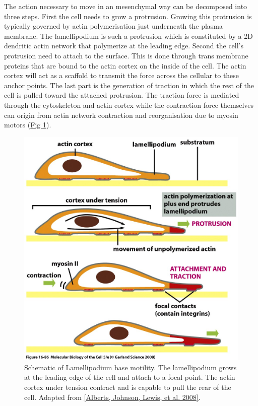 \documentclass[A4paperpaper,11pt,english]{sphinxmanual}
\begin{document}
The action necessary to move in an mesenchymal way can be decomposed into three
steps. First the cell needs to grow a protrusion. Growing this protrusion is
typically governed by actin polymerisation just underneath the plasma membrane. The
lamellipodium is such a protrusion which is constituted by a 2D dendritic actin network
that polymerize at the leading edge. Second the cell's protrusion
need to attach to the surface. This is done through trans membrane proteins
that are bound to the actin cortex on the inside of the cell. The actin cortex
will act as a scaffold to transmit the force across the cellular to these
anchor points. The last part is the generation of traction in which the rest of the cell is pulled
toward the attached protrusion. The traction force is mediated through the
cytoskeleton and actin cortex while the contraction force themselves can origin
from actin network contraction and reorganisation due to myosin motors (\hyperref[index-latex:fig-lam-principle]{Fig  \ref*{index-latex:fig-lam-principle}}).
\begin{figure}[htbp]
\centering
\capstart

\includegraphics[width=0.900\linewidth]{figure-16-86.jpg}
\caption{Schematic of Lamellipodium base motility. The lamellipodium grows at the
leading edge of the cell and attach to a focal point. The actin cortex
under tension contract and is capable to pull the rear of the cell. Adapted
from {\hyperref[index-latex:alberts2008]{{[}Alberts, Johnson, Lewis,  et al.  2008{]}}}.}\label{index-latex:fig-lam-principle}\end{figure}
\end{document}

